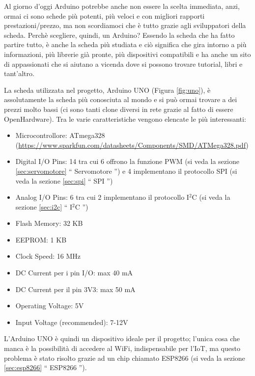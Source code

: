 \documentclass[12pt]{report}
\begin{document}
Al giorno d'oggi Arduino potrebbe anche non essere la scelta immediata, anzi, ormai ci sono schede più potenti, più veloci e con migliori rapporti prestazioni/prezzo, ma non scordiamoci che è tutto grazie agli sviluppatori della scheda. Perchè scegliere, quindi, un Arduino? Essendo la scheda che ha fatto partire tutto, è anche la scheda più studiata e ciò significa che gira intorno a più informazioni, più librerie già pronte, più dispositivi compatibili e ha anche un sito di appassionati che si aiutano a vicenda dove si possono trovare tutorial, libri e tant'altro.

La scheda utilizzata nel progetto, Arduino UNO (Figura \ref{fig:uno}), è assolutamente la scheda più conosciuta al mondo e si può ormai trovare a dei prezzi molto bassi (ci sono tanti clone diversi in rete grazie al fatto di essere OpenHardware). Tra le varie caratteristiche vengono elencate le più interessanti:

\begin{itemize}
	\item Microcontrollore: ATmega328 (\url{https://www.sparkfun.com/datasheets/Components/SMD/ATMega328.pdf})
	\item Digital I/O Pins: 14 tra cui 6 offrono la funzione PWM (si veda la sezione \ref{sec:servomotore} \textquotedblleft{} Servomotore \textquotedblright{}) e 4 implementano il protocollo SPI (si veda la sezione \ref{sec:spi} \textquotedblleft{} SPI \textquotedblright{})
	\item Analog I/O Pins: 6 tra cui 2 implementano il protocollo I$^2$C (si veda la sezione \ref{sec:i2c} \textquotedblleft{} I$^2$C \textquotedblright{})
	\item Flash Memory: 32 KB
	\item EEPROM: 1 KB
	\item Clock Speed: 16 MHz
	\item DC Current per i pin I/O: max 40 mA
	\item DC Current per il pin 3V3: max 50 mA
	\item Operating Voltage: 5V
	\item Input Voltage (recommended): 7-12V
\end{itemize}

L'Arduino UNO è quindi un dispositivo ideale per il progetto; l'unica cosa che manca è la possibilità di accedere al WiFi, indispensabile per l'IoT, ma questo problema è stato risolto grazie ad un chip chiamato ESP8266 (si veda la sezione \ref{sec:esp8266} \textquotedblleft{} ESP8266 \textquotedblright{}).
\end{document}

